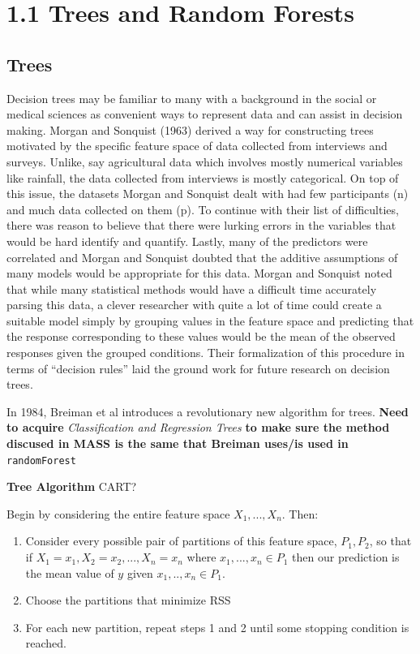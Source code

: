 \documentclass[12pt,twoside]{reedthesis}
\begin{document}
  \section{1.1 Trees and Random Forests}\label{trees-and-random-forests}
  
  \subsection{Trees}\label{trees}
  
  Decision trees may be familiar to many with a background in the social
  or medical sciences as convenient ways to represent data and can assist
  in decision making. Morgan and Sonquist (1963) derived a way for
  constructing trees motivated by the specific feature space of data
  collected from interviews and surveys. Unlike, say agricultural data
  which involves mostly numerical variables like rainfall, the data
  collected from interviews is mostly categorical. On top of this issue,
  the datasets Morgan and Sonquist dealt with had few participants (n) and
  much data collected on them (p). To continue with their list of
  difficulties, there was reason to believe that there were lurking errors
  in the variables that would be hard identify and quantify. Lastly, many
  of the predictors were correlated and Morgan and Sonquist doubted that
  the additive assumptions of many models would be appropriate for this
  data. Morgan and Sonquist noted that while many statistical methods
  would have a difficult time accurately parsing this data, a clever
  researcher with quite a lot of time could create a suitable model simply
  by grouping values in the feature space and predicting that the response
  corresponding to these values would be the mean of the observed
  responses given the grouped conditions. Their formalization of this
  procedure in terms of ``decision rules'' laid the ground work for future
  research on decision trees.
  
  In 1984, Breiman et al introduces a revolutionary new algorithm for
  trees. \textbf{Need to acquire} \emph{Classification and Regression
  Trees} \textbf{to make sure the method discused in MASS is the same that
  Breiman uses/is used in} \texttt{randomForest}
  
  \textbf{Tree Algorithm} CART?
  
  Begin by considering the entire feature space \(X_1, ..., X_n\). Then:
  
  \begin{enumerate}
  \def\labelenumi{\arabic{enumi}.}
  \item
    Consider every possible pair of partitions of this feature space,
    \(P_1, P_2\), so that if \(X_1 = x_1 , X_2 = x_2,..., X_n = x_n\)
    where \({x_1,...,x_n} \in P_1\) then our prediction is the mean value
    of \(y\) given \(x_1,..,x_n \in P_1\).
  \item
    Choose the partitions that minimize RSS
  \item
    For each new partition, repeat steps 1 and 2 until some stopping
    condition is reached.
  \end{enumerate}
  
\end{document}
